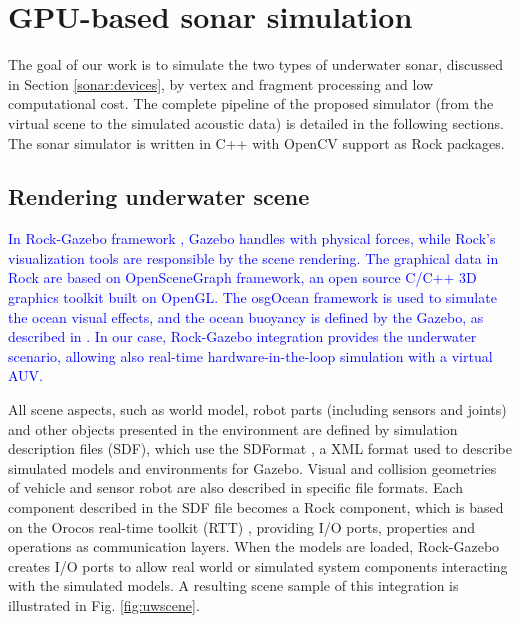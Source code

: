 \documentclass[final,5p,times]{elsarticle}
\begin{document}

\section{GPU-based sonar simulation}
\label{dev}

The goal of our work is to simulate the two types of underwater sonar, discussed in Section \ref{sonar:devices}, by vertex and fragment processing and low computational cost. The complete pipeline of the proposed simulator (from the virtual scene to the simulated acoustic data) is detailed in the following sections. The sonar simulator is written in C++ with OpenCV \cite{bradski2000} support as Rock packages.


\subsection{Rendering underwater scene}
\label{dev:uwscene}

\textcolor{blue}{In Rock-Gazebo framework \cite{watanabe2015}, Gazebo handles with physical forces, while Rock's visualization tools are responsible by the scene rendering. The graphical data in Rock are based on OpenSceneGraph framework, an open source C/C++ 3D graphics toolkit built on OpenGL. The osgOcean framework is used to simulate the ocean visual effects, and the ocean buoyancy is defined by the Gazebo, as described in \cite{watanabe2015}. In our case, Rock-Gazebo integration provides the underwater scenario, allowing also real-time hardware-in-the-loop simulation with a virtual AUV.}

All scene aspects, such as world model, robot parts (including sensors and
joints) and other objects presented in the environment are defined by simulation description files (SDF), which use the SDFormat \cite{sdformat2017}, a XML format used to describe simulated models and environments for Gazebo. Visual and collision geometries of vehicle and sensor robot are also described in specific file formats. Each component described in the SDF file becomes a Rock component, which is based on the Orocos real-time toolkit (RTT) \cite{soetens2005}, providing I/O ports, properties and operations as communication layers. When the models are loaded, Rock-Gazebo creates I/O ports to allow real world or simulated system components interacting with the simulated models. A resulting scene sample of this integration is illustrated in Fig. \ref{fig:uwscene}.
\end{document}
